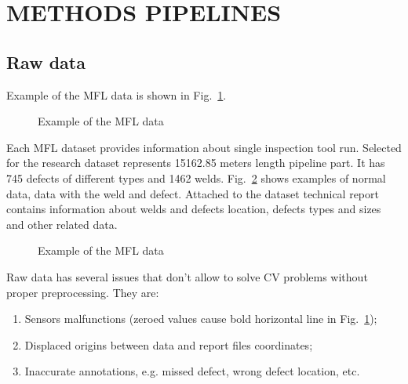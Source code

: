 \section{METHODS PIPELINES}
\label{METHODS PIPELINES}

\subsection{Raw data}
Example of the MFL data is shown in Fig.~\ref{ris:data_example}.

\begin{figure}[ht]
	\caption{Example of the MFL data}
	\label{ris:data_example}
\end{figure}
Each MFL dataset provides information about single inspection tool run.
Selected for the research dataset represents 15162.85 meters length pipeline part.
It has 745 defects of different types and 1462 welds.
Fig.~\ref{ris:defect_example} shows examples of normal data, data with the weld and defect.
Attached to the dataset technical report contains information about welds and defects location, defects types and sizes and other related data.
\begin{figure}[ht]
	\caption{Example of the MFL data}
	\label{ris:defect_example}
\end{figure}

Raw data has several issues that don't allow to solve CV problems without proper preprocessing.
They are:
\begin{enumerate}
	\item Sensors malfunctions (zeroed values cause bold horizontal line in Fig.~\ref{ris:data_example});
	\item Displaced origins between data and report files coordinates;
	\item Inaccurate annotations, e.g. missed defect, wrong defect location, etc.
\end{enumerate}


